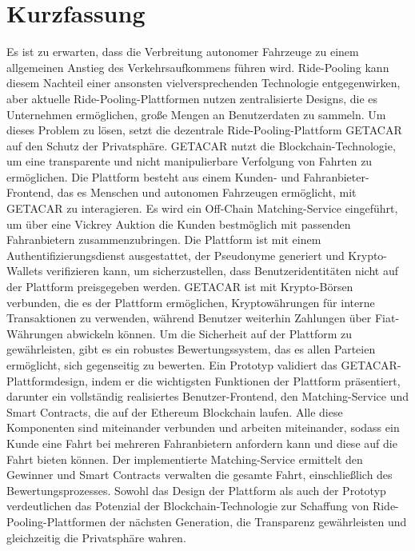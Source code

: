 \documentclass[
  a4paper,  %
  twoside,  %
  bibliography=totoc,
  headsepline,
  cleardoublepage=empty,
  parskip=half,
  draft=false
]{scrbook}
\begin{document}
  \section*{Kurzfassung}
Es ist zu erwarten, dass die Verbreitung autonomer Fahrzeuge zu einem allgemeinen Anstieg des Verkehrsaufkommens führen wird. Ride-Pooling kann diesem Nachteil einer ansonsten vielversprechenden Technologie entgegenwirken, aber aktuelle Ride-Pooling-Plattformen nutzen zentralisierte Designs, die es Unternehmen ermöglichen, große Mengen an Benutzerdaten zu sammeln. Um dieses Problem zu lösen, setzt die dezentrale Ride-Pooling-Plattform GETACAR auf den Schutz der Privatsphäre. GETACAR nutzt die Blockchain-Technologie, um eine transparente und nicht manipulierbare Verfolgung von Fahrten zu ermöglichen. Die Plattform besteht aus einem Kunden- und Fahranbieter-Frontend, das es Menschen und autonomen Fahrzeugen ermöglicht, mit GETACAR zu interagieren. Es wird ein Off-Chain Matching-Service eingeführt, um über eine Vickrey Auktion die Kunden bestmöglich mit passenden Fahranbietern zusammenzubringen. Die Plattform ist mit einem Authentifizierungsdienst ausgestattet, der Pseudonyme generiert und Krypto-Wallets verifizieren kann, um sicherzustellen, dass Benutzeridentitäten nicht auf der Plattform preisgegeben werden. GETACAR ist mit Krypto-Börsen verbunden, die es der Plattform ermöglichen, Kryptowährungen für interne Transaktionen zu verwenden, während Benutzer weiterhin Zahlungen über Fiat-Währungen abwickeln können. Um die Sicherheit auf der Plattform zu gewährleisten, gibt es ein robustes Bewertungssystem, das es allen Parteien ermöglicht, sich gegenseitig zu bewerten. Ein Prototyp validiert das GETACAR-Plattformdesign, indem er die wichtigsten Funktionen der Plattform präsentiert, darunter ein vollständig realisiertes Benutzer-Frontend, den Matching-Service und Smart Contracts, die auf der Ethereum Blockchain laufen. Alle diese Komponenten sind miteinander verbunden und arbeiten miteinander, sodass ein Kunde eine Fahrt bei mehreren Fahranbietern anfordern kann und diese auf die Fahrt bieten können. Der implementierte Matching-Service ermittelt den Gewinner und Smart Contracts verwalten die gesamte Fahrt, einschließlich des Bewertungsprozesses. Sowohl das Design der Plattform als auch der Prototyp verdeutlichen das Potenzial der Blockchain-Technologie zur Schaffung von Ride-Pooling-Plattformen der nächsten Generation, die Transparenz gewährleisten und gleichzeitig die Privatsphäre wahren.


\cleardoublepage
\end{document}
